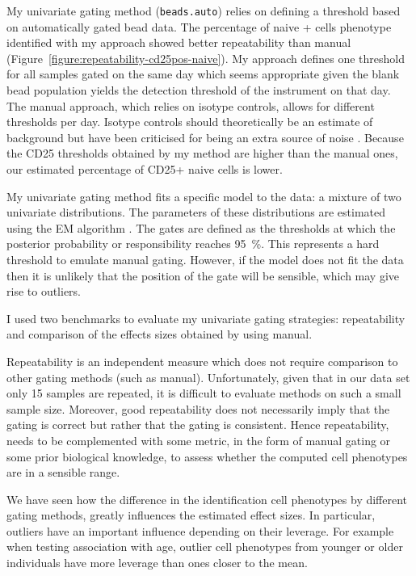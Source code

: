 My  univariate gating method (\texttt{beads.auto}) relies on defining a threshold based on automatically gated bead data.
The percentage of naive + cells phenotype identified with my approach showed better repeatability than manual (Figure~\ref{figure:repeatability-cd25pos-naive}).
My approach defines one threshold for all samples gated on the same day which seems appropriate given the blank bead population
yields the detection threshold of the instrument on that day.
The manual approach, which relies on isotype controls, allows for different thresholds per day.
Isotype controls should theoretically be an estimate of background but have been criticised for being an extra source of noise \citep{OGorman:1999vd}.
Because the CD25 thresholds obtained by my method are higher than the manual ones, our estimated percentage of 
CD25+ naive cells is lower.

My  univariate gating method fits a specific model to the data: a mixture of two univariate distributions.
The parameters of these distributions are estimated using the EM algorithm \citep{Dempster:1977ul}.
The gates are defined as the thresholds at which the posterior probability or responsibility reaches \SI{95}{\percent}.
This represents a hard threshold to emulate manual gating.
However, if the model does not fit the data then it is unlikely that the position of the gate will be sensible,
which may give rise to outliers.

I used two benchmarks to evaluate my univariate gating strategies: repeatability and comparison of the effects sizes obtained 
by \citet{Dendrou:2009dv} using manual.

Repeatability is an independent measure which does not require comparison to other gating methods (such as manual).
Unfortunately, given that in our data set only 15 samples are repeated, it is difficult to evaluate methods on such a small sample size.
Moreover, good repeatability does not necessarily imply that the gating is correct but rather that the gating is consistent.
Hence repeatability, needs to be complemented with some metric, in the form of manual gating or some prior biological knowledge, to assess whether the computed cell phenotypes are in a sensible range.

We have seen how the difference in the identification cell phenotypes by different gating methods, greatly influences the estimated effect sizes.
In particular, outliers have an important influence depending on their leverage.
For example when testing association with age, outlier cell phenotypes from younger or older individuals have more leverage than ones closer to the mean.

